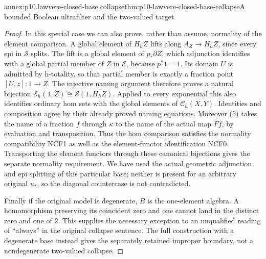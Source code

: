 \begin{annexitem}{annex:p10.lawvere-closed-base.collapse}{thm:p10-lawvere-closed-base-collapse}{A bounded Boolean ultrafilter and the two-valued target}
\begin{proof}
In this special case we can also prove, rather than assume, normality
of the element comparison. A global element of \(H_hZ\) lifts
along \(A_Z\to H_hZ\), since every epi in \(\mathcal S\)
splits. The lift is a global element of \(p_*\partial Z\),
which adjunction identifies with a global partial member of \(Z\)
in \(\mathcal E\), because \(p^*1=1\). Its domain \(U\)
is admitted by h-totality, so that partial member is exactly a
fraction point \([U,z]:1\to Z\). The injective naming argument
therefore proves a natural bijection
\(\mathcal E_h(1,Z)\cong\mathcal S(1,H_hZ)\).
Applied to every exponential this also identifies ordinary hom sets
with the global elements of \(\mathcal C_h(X,Y)\). Identities
and composition agree by their already proved naming equations.
Moreover (5) takes the name of a fraction \(f\) through \(\kappa\)
to the name of the actual map \(Ff\), by evaluation and transposition.
Thus the hom comparison satisfies the normality compatibility NCF1
as well as the element-functor identification NCF0.
Transporting the element functors through these canonical bijections
gives the separate normality requirement. We have used the actual
geometric adjunction and epi splitting of this particular base;
neither is present for an arbitrary original \(u_*\), so the
diagonal countercase is not contradicted.

Finally if the original model is degenerate, \(B\) is the
one-element algebra. A homomorphism preserving its coincident zero
and one cannot land in the distinct zero and one of \(2\).
This supplies the necessary exception to an unqualified reading of
``always'' in the original collapse sentence. The full construction
with a degenerate base instead gives the separately retained improper
boundary, not a nondegenerate two-valued collapse.
\end{proof}
\end{annexitem}
